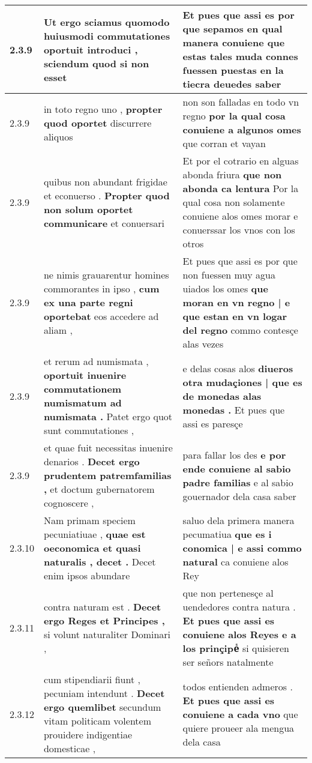 \begin{tabular}{|p{1cm}|p{6.5cm}|p{6.5cm}|}
2.3.9 & Ut ergo sciamus quomodo huiusmodi commutationes \textbf{ oportuit introduci , } sciendum quod si non esset & Et pues que assi es por que sepamos en qual manera conuiene \textbf{ que estas tales muda connes fuessen puestas en la } tiecra deuedes saber \\\hline
2.3.9 & in toto regno uno , \textbf{ propter quod oportet } discurrere aliquos & non son falladas en todo vn regno \textbf{ por la qual cosa conuiene a algunos omes } que corran et vayan \\\hline
2.3.9 & quibus non abundant frigidae et econuerso . \textbf{ Propter quod non solum oportet communicare } et conuersari & Et por el cotrario en alguas abonda friura \textbf{ que non abonda ca lentura } Por la qual cosa non solamente conuiene alos omes morar e conuerssar los vnos con los otros \\\hline
2.3.9 & ne nimis grauarentur homines commorantes in ipso , \textbf{ cum ex una parte regni oportebat } eos accedere ad aliam , & Et pues que assi es por que non fuessen muy agua uiados los omes \textbf{ que moran en vn regno | e que estan en vn logar del regno } commo contesçe alas vezes \\\hline
2.3.9 & et rerum ad numismata , \textbf{ oportuit inuenire commutationem numismatum ad numismata . } Patet ergo quot sunt commutationes , & e delas cosas alos \textbf{ diueros otra mudaçiones | que es de monedas alas monedas . } Et pues que assi es paresçe \\\hline
2.3.9 & et quae fuit necessitas inuenire denarios . \textbf{ Decet ergo prudentem patremfamilias , } et doctum gubernatorem cognoscere , & para fallar los des \textbf{ e por ende conuiene al sabio padre familias } e al sabio gouernador dela casa saber \\\hline
2.3.10 & Nam primam speciem pecuniatiuae , \textbf{ quae est oeconomica et quasi naturalis , decet . } Decet enim ipsos abundare & saluo dela primera manera pecumatiua \textbf{ que es i conomica | e assi commo natural } ca conuiene alos Rey \\\hline
2.3.11 & contra naturam est . \textbf{ Decet ergo Reges et Principes , } si volunt naturaliter Dominari , & que non pertenesçe al uendedores contra natura . \textbf{ Et pues que assi es conuiene alos Reyes e a los prinçipeᷤ } si quisieren ser señors natalmente \\\hline
2.3.12 & cum stipendiarii fiunt , pecuniam intendunt . \textbf{ Decet ergo quemlibet } secundum vitam politicam volentem prouidere indigentiae domesticae , & todos entienden admeros . \textbf{ Et pues que assi es conuiene a cada vno } que quiere proueer ala mengua dela casa \\\hline

\end{tabular}
